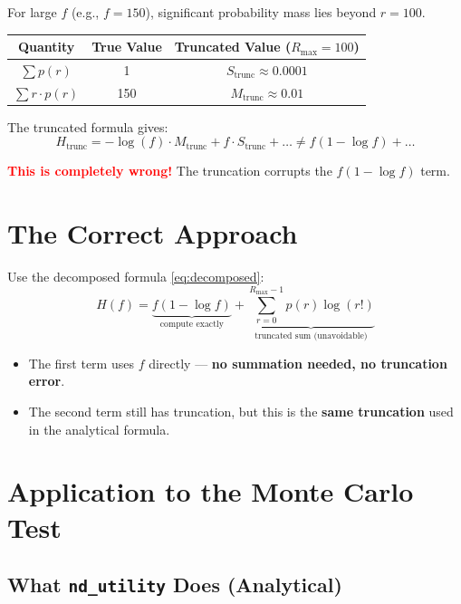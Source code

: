 \documentclass[11pt]{article}
\begin{document}
For large $f$ (e.g., $f = 150$), significant probability mass lies beyond $r = 100$.

\begin{center}
\begin{tabular}{|c|c|c|}
\hline
\textbf{Quantity} & \textbf{True Value} & \textbf{Truncated Value ($R_{\max}=100$)} \\
\hline
$\sum p(r)$ & 1 & $S_{\text{trunc}} \approx 0.0001$ \\
$\sum r \cdot p(r)$ & 150 & $M_{\text{trunc}} \approx 0.01$ \\
\hline
\end{tabular}
\end{center}

The truncated formula gives:
\begin{equation}
H_{\text{trunc}} = -\log(f) \cdot M_{\text{trunc}} + f \cdot S_{\text{trunc}} + \ldots \neq f(1 - \log f) + \ldots
\end{equation}

\textcolor{red}{\textbf{This is completely wrong!}} The truncation corrupts the $f(1-\log f)$ term.

\section{The Correct Approach}

Use the decomposed formula \eqref{eq:decomposed}:
\begin{equation}
H(f) = \underbrace{f(1 - \log f)}_{\text{compute exactly}} + \underbrace{\sum_{r=0}^{R_{\max}-1} p(r) \log(r!)}_{\text{truncated sum (unavoidable)}}
\end{equation}

\begin{itemize}
\item The first term uses $f$ directly --- \textbf{no summation needed, no truncation error}.
\item The second term still has truncation, but this is the \textbf{same truncation} used in the analytical formula.
\end{itemize}

\section{Application to the Monte Carlo Test}

\subsection{What \texttt{nd\_utility} Does (Analytical)}
\end{document}
